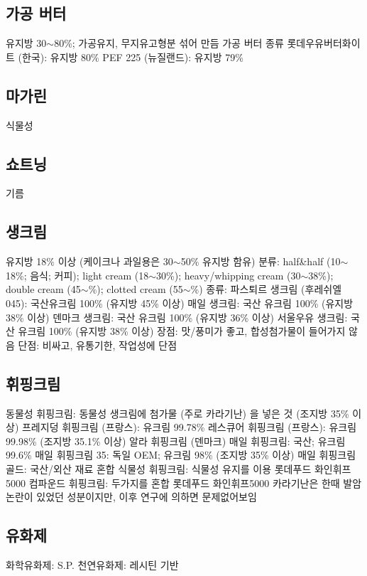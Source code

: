 \documentclass{myproc}
\begin{document}
\subsection{\textcolor{blue2}{가공 버터}}
\bit
\w 유지방 30$\sim$80\%; 가공유지, 무지유고형분 섞어 만듬
\w 가공 버터 종류
  \bit
  \w 롯데우유버터화이트 (한국): 유지방 80\% 
  \w PEF 225 (뉴질랜드): 유지방 79\%
  \eit
  \eit
\subsection{\textcolor{blue2}{마가린}}
\bit
\w 식물성
\eit
\subsection{\textcolor{blue2}{쇼트닝}}
\bit
\w 기름
\eit
  
  
\subsection{\textcolor{blue2}{생크림}}
\bit
\w 유지방 18\% 이상 (케이크나 과일용은 30$\sim$50\% 유지방 함유)
\w 분류:
  half\&half (10$\sim$18\%; 음식; 커피);
  light cream (18$\sim$30\%);
  heavy/whipping cream (30$\sim$38\%);
  double cream (45$\sim$\%);
  clotted cream (55$\sim$\%)
\w 종류:
  \bit
  \w 파스퇴르 생크림 (후레쉬엘 045): 국산유크림 100\% (유지방 45\% 이상)
  \w 매일 생크림: 국산 유크림 100\% (유지방 38\% 이상)
  \w 덴마크 생크림: 국산 유크림 100\% (유지방 36\% 이상)
  \w 서울우유 생크림: 국산 유크림 100\% (유지방 38\% 이상)
  \eit
\w 장점: 맛/풍미가 좋고, 합성첨가물이 들어가지 않음
\w 단점: 비싸고, 유통기한, 작업성에 단점
\eit
\subsection{\textcolor{blue2}{휘핑크림}}
\bit
\w 동물성 휘핑크림: 동물성 생크림에 첨가물 (주로 카라기난) 을 넣은 것 (조지방 35\% 이상)
   \bit
   \w 프레지덩 휘핑크림 (프랑스): 유크림 99.78\%
   \w 레스큐어 휘핑크림 (프랑스): 유크림 99.98\% (조지방 35.1\% 이상)
   \w 알라 휘핑크림 (덴마크)
   \w 매일 휘핑크림: 국산; 유크림 99.6\%
   \w 매일 휘핑크림 35: 독일 OEM; 유크림 98\% (조지방 35\% 이상)
   \w 매일 휘핑크림 골드: 국산/외산 재료 혼합
   \eit
\w 식물성 휘핑크림: 식물성 유지를 이용
   \bit
   \w 롯데푸드 화인휘프5000
   \eit
\w 컴파운드 휘핑크림: 두가지를 혼합
   \bit
   \w 롯데푸드 화인휘프5000
   \eit
\w 카라기난은 한때 발암 논란이 있었던 성분이지만, 이후 연구에 의하면 문제없어보임
\eit

\subsection{\textcolor{blue2}{유화제}}
\bit
\w 화학유화제: S.P.
\w 천연유화제: 레시틴 기반
\eit
\end{document}
